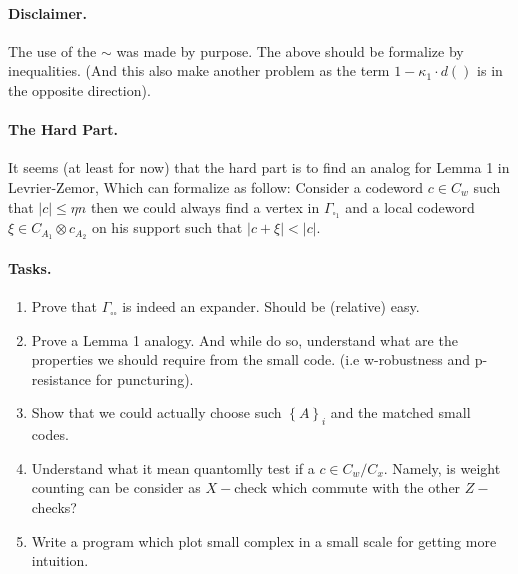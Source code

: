 \documentclass{article}
\begin{document}
\begin{multicols*}{2}
	\paragraph{Disclaimer.} The use of the $\sim$ was  made by purpose. The above should be formalize by inequalities. (And this also make another problem as 
	the term $ 1 - \kappa_{1} \cdot d\left(  \right) $ is in the opposite direction). 
	\paragraph{The Hard Part.} It seems (at least for now) that the hard part is to find an analog for Lemma 1 in Levrier-Zemor, Which can formalize 
	as follow: Consider a codeword $c \in C_{w}$ such that $|c| \le \eta n $ then we could always find a vertex in $\Gamma_{\square_{1}} $
	and a local codeword $\xi \in C_{A_1} \otimes c_{A_2} $ on his support such that $|c + \xi| < |c| $.     
      

	\paragraph{Tasks.}
	\begin{enumerate}
	  \item Prove that $\Gamma_{\square \square } $ is indeed an expander. Should be (relative) easy.
	  \item Prove a Lemma 1 analogy. And while do so, understand what are the properties we should require from the small code.
	    (i.e w-robustness and p-resistance for puncturing). 
	  \item Show that we could actually choose such $\left\{ A \right\}_{i}$ and the matched small codes.
	  \item Understand what it mean quantomlly test if a $c \in C_{w}/ C_{x}$. Namely, is weight counting can be consider as 
	    $X-$check which commute with the other $Z-$checks? 
	  \item Write a program which plot small complex in a small scale for getting more intuition. 
	\end{enumerate}

	\newcommand{ \Aa } { C_{A_{1}}}  
	\newcommand{ \Ab } { C_{A_{2}}}
	\newcommand{ \Ac } { C_{A_{3}}}
	\newcommand{ \Aab } { \Aa \otimes \Ab } 
	\newcommand{ \Aac } { \Aa \otimes \Ac }
	\newcommand{ \Aabc } { \Aa \otimes \Ab \otimes \Ac }
	\newcommand{ \YY } {  y_{1}y_{2}^{\top} }
	\newcommand{ \ZZ } {  z_{1}z_{2}^{\top} } 
	\newcommand{ \TT } { \tilde{\tau} } 


\end{multicols*}
\end{document}
